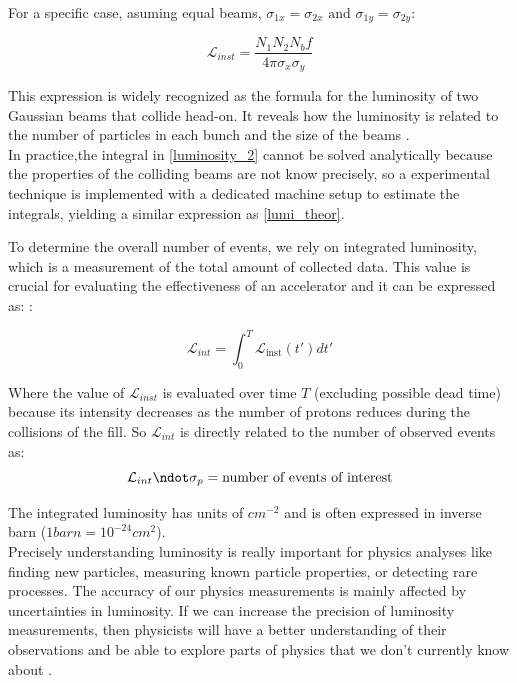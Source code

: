 For a specific case, asuming equal beams, $\sigma_{1x}= \sigma_{2x} \text{ and } \sigma_{1y}= \sigma_{2y}$:

\begin{equation}
  \mathcal{L}_{inst}= \frac{N_{1} N_{2} N_{b}f }{4\pi \sigma_{x} \sigma_{y}}
  \label{lumi_theor}
\end{equation}

This expression is widely recognized as the formula for the luminosity of two Gaussian beams that collide head-on. It reveals how the luminosity is related to the number of particles in each bunch and the size of the beams \cite{concept_of_luminosity}.\\

In practice,the integral in  \ref{luminosity_2} cannot be solved analytically because   the properties of the colliding beams are not know precisely, so a experimental technique is implemented with a dedicated machine setup to estimate the integrals, yielding a similar expression as \ref{lumi_theor}.

To determine the overall number of events, we rely on integrated luminosity, which is a measurement of the total amount of collected data. This value is crucial for evaluating the effectiveness of an accelerator and it can be expressed as: \cite{concept_of_luminosity}:

\begin{equation}
  \mathcal{L}_{int}=\int_{0}^{T} \mathcal {L}_{\text{inst}}(t') dt'
\end{equation}

Where the value of $\mathcal{L}_{inst}$ is evaluated over time $T$ (excluding possible dead time) because its intensity decreases as the number of protons reduces during the collisions of the fill. So $\mathcal{L}_{int}$ is directly related to the number of observed events as:
\begin{equation}
  \mathcal{L}_{int} \ndot \sigma_{p}= \text{number of events of interest}
\end{equation}

The integrated luminosity has units of $cm^{-2}$ and is often expressed in inverse barn ($1 barn= 10^{-24}cm^{2}$). \\

Precisely understanding luminosity is really important for physics analyses like finding new particles, measuring known particle properties, or detecting rare processes. The accuracy of our physics measurements is mainly affected by uncertainties in luminosity. If we can increase the precision of luminosity measurements, then physicists will have a better understanding of their observations and be able to explore parts of physics that we don't currently know about \cite{luminosity_importance}.

